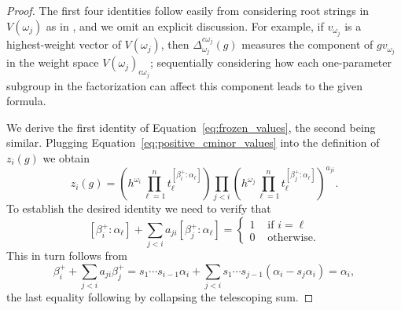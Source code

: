 \documentclass[12pt]{amsart}
\newcommand{\cvar}{z}
\theoremstyle{remark}
\numberwithin{equation}{section}
\numberwithin{figure}{section}
\begin{document}
\begin{proof}
  The first four identities follow easily from considering root strings in $V(\omega_j)$ as in \cite[Proof of eq. 3.20]{YZ08}, and we omit an explicit discussion.
  For example, if $v_{\omega_j}$ is a highest-weight vector of $V(\omega_j)$, then $\Delta^{c\omega_j}_{\omega_j}(g)$ measures the component of $gv_{\omega_j}$ in the weight space $V(\omega_j)_{c \omega_j}$; sequentially considering how each one-parameter subgroup in the factorization can affect this component leads to the given formula.

  We derive the first identity of Equation~\ref{eq:frozen_values}, the second being similar.
  Plugging Equation~\ref{eq:positive_cminor_values} into the definition of $\cvar_i(g)$ we obtain 
  \[
    \cvar_i(g)
    =
    \left(h^{\omega_i}\prod_{\ell =1}^n t_{\ell}^{[\beta_i^+:\alpha_\ell]}\right)
    \prod_{j<i}\left(h^{\omega_j}\prod_{\ell=1}^n t_{\ell}^{[\beta_j^+:\alpha_\ell]}\right)^{a_{ji}}.
  \]
  To establish the desired identity we need to verify that
  \[
    [\beta_i^+:\alpha_\ell]+\sum_{j<i}a_{ji}[\beta_j^+:\alpha_\ell]
    =
    \begin{cases}
      1 & \text{ if $i=\ell$}\\
      0 & \text{ otherwise.}
    \end{cases}
  \]
  This in turn follows from 
  \begin{equation}\label{eq:alpha_to_beta}
    \beta_i^++\sum_{j<i}a_{ji}\beta_j^+ = s_1\cdots s_{i-1}\alpha_i + \sum_{j<i}s_1\cdots s_{j-1}(\alpha_i - s_j\alpha_i)
    =
    \alpha_i,
  \end{equation}
  the last equality following by collapsing the telescoping sum.
\end{proof}
\end{document}
